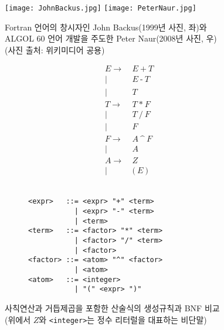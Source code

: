 \begin{figure}\centering
\texttt{[image: JohnBackus.jpg]}
\qquad\qquad\qquad
\texttt{[image: PeterNaur.jpg]}
\caption{Fortran 언어의 창시자인 John Backus(1999년 사진, 좌)와\\
         ALGOL 60 언어 개발을 주도한 Peter Naur(2008년 사진, 우)\\
         {\scriptsize(사진 출처: 위키미디어 공용)}\label{fig:BackusNaur}}
\end{figure}
\begin{figure}[H]\vspace*{-4ex}
\hfill
\begin{subfigure}[b]{.2\linewidth}\addtolength{\jot}{-.3em}
\begin{align*}
E \to~& E ~\texttt{+}~ T \\
 \mid~& E ~\texttt{-}~ T \\
 \mid~& T \\
T \to~& T ~\texttt{*}~ F \\
 \mid~& T ~\texttt{/}~ F \\
 \mid~& F \\
F \to~& A ~\texttt{\char`^}~ F \\
 \mid~& A \\
A \to~& Z \\
 \mid~& \texttt{(}~ E ~\texttt{)}
\end{align*}
~\vspace*{-2.8ex}
\end{subfigure}
\qquad\qquad
\begin{subfigure}[b]{.6\linewidth}
\begin{lstlisting}
<expr>   ::= <expr> "+" <term>
           | <expr> "-" <term>
           | <term>
<term>   ::= <factor> "*" <term>
           | <factor> "/" <term>
           | <factor>
<factor> ::= <atom> "^" <factor>
           | <atom>
<atom>   ::= <integer>
           | "(" <expr> ")"
\end{lstlisting}
\end{subfigure}
\caption{사칙연산과 거듭제곱을 포함한 산술식의 생성규칙과 BNF 비교\\
         {\small(위에서 $Z$와 \texttt{<integer>}는 정수 리터럴을 대표하는 비단말)}
         \label{fig:BNF}}
\end{figure}
